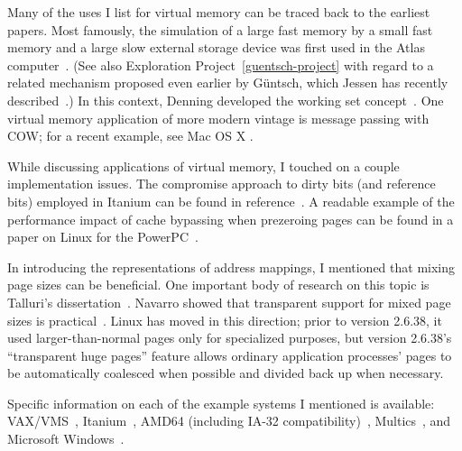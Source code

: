 Many of the uses I list for virtual memory can be traced back to the
earliest papers.  Most famously, the simulation of a large fast memory
by a small fast memory and a large slow external storage device was
first used in the Atlas computer~\cite{max1052,max1053}.
(See also Exploration Project~\ref{guentsch-project} with regard to a
related mechanism proposed even earlier by G{\"u}ntsch, which Jessen
has recently described~\cite{max1173}.) In this
context, Denning developed the working set concept~\cite{max1017}.
One virtual memory application of more modern vintage is message
passing with COW; for a recent example, see Mac OS X \cite{max1076}.

While discussing applications of virtual memory, I touched on a
couple implementation issues.  The compromise approach to dirty bits
(and reference bits) employed in Itanium can be found in reference~\cite{max1064}.
A readable example of the performance impact of cache bypassing when
prezeroing pages can be found in a paper on Linux for the
PowerPC~\cite{max1061}.

In introducing the representations of address mappings, I mentioned
that mixing page sizes can be beneficial.  One important body of
research on this topic is Talluri's dissertation~\cite{max1077}.
Navarro showed that transparent support for mixed page sizes is practical~\cite{max1193}.
Linux has moved in this direction; prior to version 2.6.38, it used
larger-than-normal pages only for specialized purposes, but version 2.6.38's ``transparent huge pages'' feature
allows ordinary application processes' pages to be automatically coalesced when possible and divided back up when necessary.

Specific information on each of the example systems I mentioned is
available: VAX/VMS~\cite{max1067}, Itanium~\cite{max1064}, AMD64
(including IA-32 compatibility)~\cite{max1065},
Multics~\cite{max1068,max1036}, and Microsoft
Windows~\cite{max981}.

